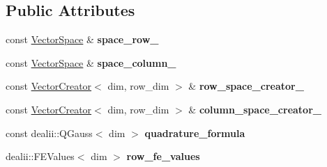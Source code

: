 \subsection*{\-Public \-Attributes}
\begin{DoxyCompactItemize}
\item 
\hypertarget{structSpacy_1_1dealII_1_1Detail_1_1LocalAssemblyBase_a56425b34eab9e4ff115a0510b4ef8d80}{const \hyperlink{classSpacy_1_1VectorSpace}{\-Vector\-Space} \& {\bfseries space\-\_\-row\-\_\-}}\label{structSpacy_1_1dealII_1_1Detail_1_1LocalAssemblyBase_a56425b34eab9e4ff115a0510b4ef8d80}

\item 
\hypertarget{structSpacy_1_1dealII_1_1Detail_1_1LocalAssemblyBase_ac7e2cb1ae6e82e7b742ba445424f95f4}{const \hyperlink{classSpacy_1_1VectorSpace}{\-Vector\-Space} \& {\bfseries space\-\_\-column\-\_\-}}\label{structSpacy_1_1dealII_1_1Detail_1_1LocalAssemblyBase_ac7e2cb1ae6e82e7b742ba445424f95f4}

\item 
\hypertarget{structSpacy_1_1dealII_1_1Detail_1_1LocalAssemblyBase_a7e6212a0a69a567a098b37be7e84c773}{const \hyperlink{classSpacy_1_1dealII_1_1VectorCreator}{\-Vector\-Creator}$<$ dim, \*
row\-\_\-dim $>$ \& {\bfseries row\-\_\-space\-\_\-creator\-\_\-}}\label{structSpacy_1_1dealII_1_1Detail_1_1LocalAssemblyBase_a7e6212a0a69a567a098b37be7e84c773}

\item 
\hypertarget{structSpacy_1_1dealII_1_1Detail_1_1LocalAssemblyBase_a526dfed72a82cc827edc8ca4cd066ac2}{const \hyperlink{classSpacy_1_1dealII_1_1VectorCreator}{\-Vector\-Creator}$<$ dim, \*
row\-\_\-dim $>$ \& {\bfseries column\-\_\-space\-\_\-creator\-\_\-}}\label{structSpacy_1_1dealII_1_1Detail_1_1LocalAssemblyBase_a526dfed72a82cc827edc8ca4cd066ac2}

\item 
\hypertarget{structSpacy_1_1dealII_1_1Detail_1_1LocalAssemblyBase_a64d2a187dd531b701364de8e27a757c5}{const dealii\-::\-Q\-Gauss$<$ dim $>$ {\bfseries quadrature\-\_\-formula}}\label{structSpacy_1_1dealII_1_1Detail_1_1LocalAssemblyBase_a64d2a187dd531b701364de8e27a757c5}

\item 
\hypertarget{structSpacy_1_1dealII_1_1Detail_1_1LocalAssemblyBase_a21eb2f046a9126dc88da9f24f3d32c7e}{dealii\-::\-F\-E\-Values$<$ dim $>$ {\bfseries row\-\_\-fe\-\_\-values}}\label{structSpacy_1_1dealII_1_1Detail_1_1LocalAssemblyBase_a21eb2f046a9126dc88da9f24f3d32c7e}


\end{DoxyCompactItemize}
